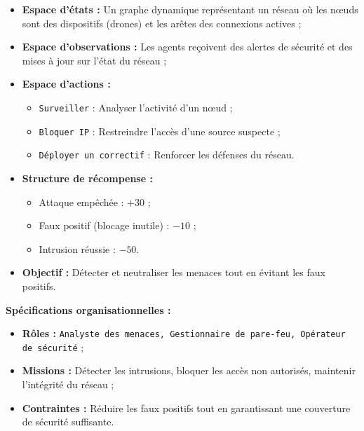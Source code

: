 \begin{itemize}
    \item \textbf{Espace d'états :} Un graphe dynamique représentant un réseau où les nœuds sont des dispositifs (drones) et les arêtes des connexions actives ;
    \item \textbf{Espace d'observations :} Les agents reçoivent des alertes de sécurité et des mises à jour sur l'état du réseau ;
    \item \textbf{Espace d'actions :}
          \begin{itemize}
              \item \texttt{Surveiller} : Analyser l'activité d'un nœud ;
              \item \texttt{Bloquer IP} : Restreindre l'accès d'une source suspecte ;
              \item \texttt{Déployer un correctif} : Renforcer les défenses du réseau.
          \end{itemize}
    \item \textbf{Structure de récompense :}
          \begin{itemize}
              \item Attaque empêchée : $+30$ ;
              \item Faux positif (blocage inutile) : $-10$ ;
              \item Intrusion réussie : $-50$.
          \end{itemize}
    \item \textbf{Objectif :} Détecter et neutraliser les menaces tout en évitant les faux positifs.
\end{itemize}

\textbf{Spécifications organisationnelles :}
\begin{itemize}
    \item \textbf{Rôles :} \texttt{Analyste des menaces, Gestionnaire de pare-feu, Opérateur de sécurité} ;
    \item \textbf{Missions :} Détecter les intrusions, bloquer les accès non autorisés, maintenir l'intégrité du réseau ;
    \item \textbf{Contraintes :} Réduire les faux positifs tout en garantissant une couverture de sécurité suffisante.
\end{itemize}

